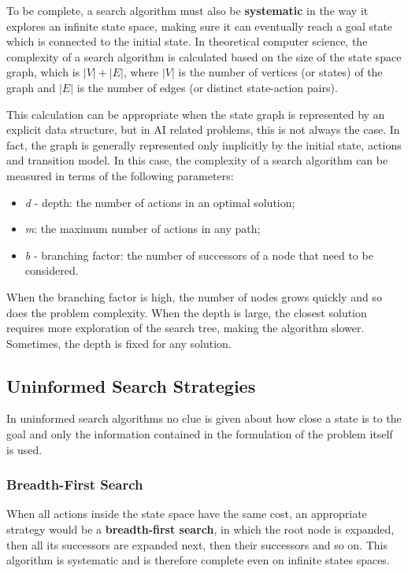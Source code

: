 \documentclass{article}
\begin{document}
To be complete, a search algorithm must also be \textbf{systematic} in the way it explores an infinite state space, making sure it can eventually reach a goal state which is connected to the initial state. In theoretical computer science, the complexity of a search algorithm is calculated based on the size of the state space graph, which is \(|V|+|E|\), where \(|V|\) is the number of vertices (or states) of the graph and \(|E|\) is the number of edges (or distinct state-action pairs). 

This calculation can be appropriate when the state graph is represented by an explicit data structure, but in AI related problems, this is not always the case. In fact, the graph is generally represented only implicitly by the initial state, actions and transition model. In this case, the complexity of a search algorithm can be measured in terms of the following parameters:
\begin{itemize}
    \item \textit{d} - depth: the number of actions in an optimal solution;
    \item \textit{m}: the maximum number of actions in any path;
    \item \textit{b} - branching factor: the number of successors of a node that need to be considered. 
\end{itemize}

When the branching factor is high, the number of nodes grows quickly and so does the problem complexity. When the depth is large, the closest solution requires more exploration of the search tree, making the algorithm slower. Sometimes, the depth is fixed for any solution.

\subsection{Uninformed Search Strategies}
In uninformed search algorithms no clue is given about how close a state is to the goal and only the information contained in the formulation of the problem itself is used.

\subsubsection{Breadth-First Search}
When all actions inside the state space have the same cost, an appropriate strategy would be a \textbf{breadth-first search}, in which the root node is expanded, then all its successors are expanded next, then their successors and so on. This algorithm is systematic and is therefore complete even on infinite states spaces.
\end{document}
